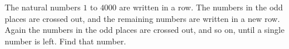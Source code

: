 The natural numbers $1$ to $4000$ are written in a row. The numbers in the odd places are crossed out, and the remaining numbers are written in a new row. Again the numbers in the odd places are crossed out, and so on, until a single number is left. Find that number.

